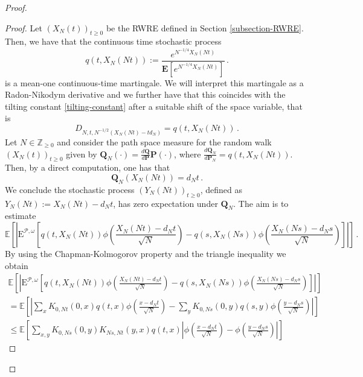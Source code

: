 \documentclass[a4paper,11pt,oneside,reqno]{amsart}
\theoremstyle{definition}
\renewcommand{\leq}{\leqslant}
\renewcommand{\geq}{\geqslant}
\numberwithin{equation}{section}
\begin{document}
\begin{proof}
\begin{proof}
{\color{black}	Let $(X_{N}(t))_{t\geq 0}$ be the RWRE defined in Section \ref{subsection-RWRE}. Then, we have that  the continuous time stochastic process
	\begin{equation}\label{q-definition}
q(t,X_{N}(Nt)):= \frac{e^{N^{-1/4}X_{N}(Nt)}}{\mathbf{E}[e^{N^{-1/4}X_{N}(Nt)}]}\,.
	\end{equation}
	is a mean-one continuous-time martingale. We will interpret this martingale as a Radon-Nikodym derivative and we further have that this coincides with the tilting constant \eqref{tilting-constant} after a suitable shift of the space variable, that is
	\begin{equation*}
			D_{N,t,N^{-1/2}(X_{N}(Nt)-td_{N})}=q(t,X_{N}(Nt))\,.
			\end{equation*} 
			Let $N\in \mathbb{Z}_{\geq 0}$ and consider the path space measure for the random walk $(X_{N}(t))_{t\geq 0}$ given by $\mathbf{Q}_{N}(\cdot)=\frac{d \mathbf{Q}}{d\mathbf{P}}\mathbf{P}(\cdot)$, where $\frac{d\mathbf{Q}_{N}}{d\mathbf{P}_{N}}=q(t,X_{N}(Nt))$. Then, by a direct computation, one has that 
				\begin{equation*}
						\mathbf{Q}_{N}\left(X_{N}(Nt)\right)=d_{N}t\,.
					\end{equation*}
					We conclude the stochastic process $(Y_{N}(Nt))_{t\geq 0}$, defined as $Y_{N}(Nt):=X_{N}(Nt)-d_{N}t$, has zero expectation under $\mathbf{Q}_{N}$.
The aim is to estimate 
					\begin{equation*}
						\mathbb{E}\left[\left|\mathrm{E}^{\mathcal{P},\omega}\left[q(t,X_{N}(Nt))\phi\left(\frac{X_{N}(Nt)-d_{N}t}{\sqrt{N}}\right)-q(s,X_{N}(Ns))\phi\left(\frac{X_{N}(Ns)-d_{N}s}{\sqrt{N}}\right)\right]\right|\right]\,.
					\end{equation*}
					By using the Chapman-Kolmogorov property and the triangle inequality we  obtain
					\begin{multline*}
						\mathbb{E}\left[	\left|\mathrm{E}^{\mathcal{P},\omega}\left[q(t,X_{N}(Nt))\phi\left(\frac{X_{N}(Nt)-d_{N}t}{\sqrt{N}}\right)-q(s,X_{N}(Ns))\phi\left(\frac{X_{N}(Ns)-d_{N}s}{\sqrt{N}}\right)\right]\right|\right]
							\\=
							\mathbb{E}\left[\left|\sum_{x}K_{0,Nt}(0,x)q(t,x)\phi\left(\frac{x-d_{N}t}{\sqrt{N}}\right)-\sum_{y}K_{0,Ns}(0,y)q(s,y)\phi\left(\frac{y-d_{N}s}{\sqrt{N}}\right)\right|\right]
							\\\leq
							\mathbb{E}\left[\sum_{x,y}K_{0,Ns}(0,y)K_{Ns,Nt}(y,x)q(t,x)\left|\phi\left(\frac{x-d_{N}t}{\sqrt{N}}\right)-\phi\left(\frac{y-d_{N}s}{\sqrt{N}}\right)\right|\right]

\end{multline*}}
\end{proof}
\end{proof}
\end{document}
